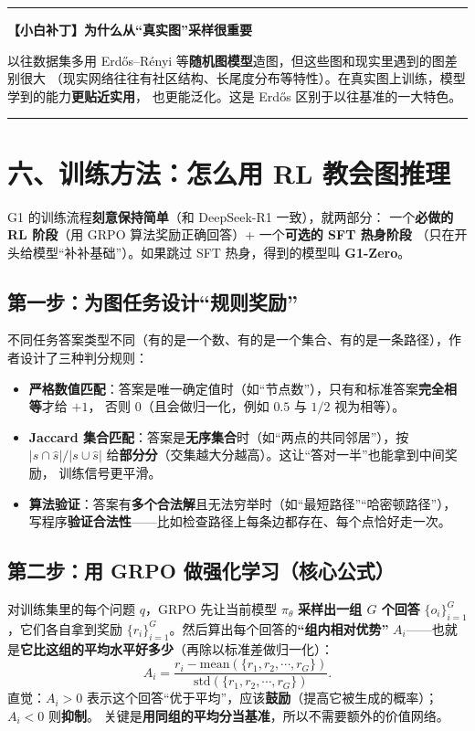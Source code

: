 \documentclass[11pt,UTF8,fontset=fandol]{ctexart}
\newenvironment{tip}[1]{%
  \par\smallskip\noindent\rule{\linewidth}{0.4pt}\par\nobreak
  \noindent\textbf{【小白补丁】#1}\par\nobreak\noindent\ignorespaces
}{%
  \par\noindent\rule{\linewidth}{0.4pt}\par\smallskip
}
\begin{document}
\begin{tip}{为什么从“真实图”采样很重要}
以往数据集多用 Erdős–Rényi 等\textbf{随机图模型}造图，但这些图和现实里遇到的图差别很大
（现实网络往往有社区结构、长尾度分布等特性）。在真实图上训练，模型学到的能力\textbf{更贴近实用}，
也更能泛化。这是 Erdős 区别于以往基准的一大特色。
\end{tip}

\section{六、训练方法：怎么用 RL 教会图推理}

G1 的训练流程\textbf{刻意保持简单}（和 DeepSeek-R1 一致），就两部分：
一个\textbf{必做的 RL 阶段}（用 GRPO 算法奖励正确回答）+ 一个\textbf{可选的 SFT 热身阶段}
（只在开头给模型“补补基础”）。如果跳过 SFT 热身，得到的模型叫 \textbf{G1-Zero}。

\subsection{第一步：为图任务设计“规则奖励”}

不同任务答案类型不同（有的是一个数、有的是一个集合、有的是一条路径），作者设计了三种判分规则：

\begin{itemize}[leftmargin=2em]
  \item \textbf{严格数值匹配}：答案是唯一确定值时（如“节点数”），只有和标准答案\textbf{完全相等}才给 $+1$，
        否则 $0$（且会做归一化，例如 $0.5$ 与 $1/2$ 视为相等）。
  \item \textbf{Jaccard 集合匹配}：答案是\textbf{无序集合}时（如“两点的共同邻居”），按
        $|s\cap\hat s|/|s\cup\hat s|$ 给\textbf{部分分}（交集越大分越高）。这让“答对一半”也能拿到中间奖励，
        训练信号更平滑。
  \item \textbf{算法验证}：答案有\textbf{多个合法解}且无法穷举时（如“最短路径”“哈密顿路径”），
        写程序\textbf{验证合法性}——比如检查路径上每条边都存在、每个点恰好走一次。
\end{itemize}

\subsection{第二步：用 GRPO 做强化学习（核心公式）}

对训练集里的每个问题 $q$，GRPO 先让当前模型 $\pi_\theta$ \textbf{采样出一组 $G$ 个回答}
$\{o_i\}_{i=1}^{G}$，它们各自拿到奖励 $\{r_i\}_{i=1}^{G}$。然后算出每个回答的\textbf{“组内相对优势”}
$A_i$——也就是\textbf{它比这组的平均水平好多少}（再除以标准差做归一化）：
\begin{equation*}
  A_i = \frac{r_i - \mathrm{mean}(\{r_1, r_2, \cdots, r_G\})}{\mathrm{std}(\{r_1, r_2, \cdots, r_G\})}. \tag{1}
\end{equation*}
直觉：$A_i>0$ 表示这个回答“优于平均”，应该\textbf{鼓励}（提高它被生成的概率）；$A_i<0$ 则\textbf{抑制}。
关键是\textbf{用同组的平均分当基准}，所以不需要额外的价值网络。
\end{document}
